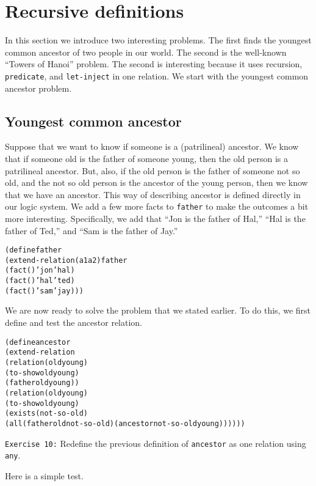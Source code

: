 \section{Recursive definitions}

In this section we introduce two interesting problems.  The first
finds the youngest common ancestor of two people in our world.  The
second is the well-known ``Towers of Hanoi'' problem.  The second
is interesting because it uses recursion, \texttt{predicate}, and
\texttt{let-inject} in one relation.  We start with the youngest common
ancestor problem.

\subsection{Youngest common ancestor}

Suppose that we want to know if someone is a (patrilineal) ancestor.
We know that if someone old is the father of someone young, then the
old person is a patrilineal ancestor.  But, also, if the old person is
the father of someone not so old, and the not so old person is the
ancestor of the young person, then we know that we have an ancestor.
This way of describing ancestor is defined directly in our logic
system.  We add a few more facts to \texttt{father} to make the
outcomes a bit more interesting.  Specifically, we add that ``Jon is
the father of Hal,'' ``Hal is the father of Ted,'' and ``Sam is the
father of Jay.''

\begin{alltt}
(define father
  (extend-relation (a1 a2) father
    (fact () 'jon 'hal)
    (fact () 'hal 'ted)
    (fact () 'sam 'jay)))
\end{alltt}

We are now ready to solve the problem that we stated earlier.  To do
this, we first define and test the ancestor relation.

\begin{alltt}
(define ancestor
  (extend-relation
    (relation (old young)
      (to-show old young)
      (father old young))
    (relation (old young)
      (to-show old young)
      (exists (not-so-old)
        (all (father old not-so-old) (ancestor not-so-old young))))))
\end{alltt}

\noindent
\texttt{Exercise 10:} Redefine the previous definition of
\texttt{ancestor} as one relation using \texttt{any}.\endofexercise

Here is a simple test.

